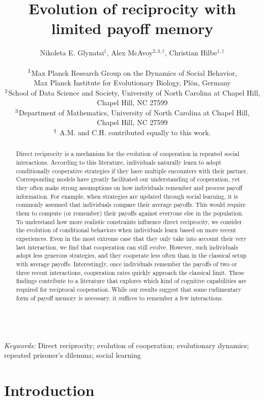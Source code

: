 \documentclass[11pt]{article}
\title{\bf  \sffamily \Large Evolution of reciprocity %
with limited payoff memory\\}
\date{}
\author{\parbox[c]{16cm}{\centering \onehalfspacing 
Nikoleta E. Glynatsi$^1$,  Alex McAvoy$^{2,3, \dagger}$, Christian Hilbe$^{1, \dagger}$\\ \quad \\
$^{\rm 1}$Max Planck Research Group on the Dynamics of Social Behavior,\\ Max Planck Institute for Evolutionary Biology, Pl\"{o}n, Germany \\
$^{\rm 2}$School of Data Science and Society, University of North Carolina at Chapel Hill,\\ Chapel Hill, NC 27599 \\
$^{\rm 3}$Department of Mathematics, University of North Carolina at Chapel Hill,\\ Chapel Hill, NC 27599 \\
$^{\rm \dagger}$ A.M. and C.H. contributed equally to this work.}}
\theoremstyle{plainCl1}
\theoremstyle{plainCl2}
\begin{document}
\maketitle


\begin{abstract}
\noindent
Direct reciprocity is a mechanism for the evolution of cooperation in repeated social interactions.
According to this literature, individuals naturally learn to adopt conditionally cooperative strategies if they have multiple encounters with their partner.
Corresponding models have greatly facilitated our understanding of cooperation, yet they often make strong assumptions on how individuals remember and process payoff information.
For example, when strategies are updated through social learning, it is commonly assumed that individuals compare their average payoffs.
This would require them to compute (or remember) their payoffs against everyone else in the population.
To understand how more realistic constraints influence direct reciprocity, we consider the evolution of conditional behaviors when individuals learn based on more recent experiences.
Even in the most extreme case that they only take into account their very last interaction, we find that cooperation can still evolve.
However, such individuals adopt less generous strategies, and they cooperate less often than in the classical setup with average payoffs.
Interestingly, once individuals remember the payoffs of two or three recent interactions, cooperation rates quickly approach the classical limit.
These findings contribute to a literature that explores which kind of cognitive capabilities are required for reciprocal cooperation.
While our results suggest that some rudimentary form of payoff memory is necessary, it suffices to remember a few interactions.
\end{abstract}



~\\
{\it Keywords:} Direct reciprocity; evolution of cooperation; evolutionary dynamics; repeated prisoner's dilemma; social learning



\clearpage
\newpage



\section{Introduction}

\end{document}
